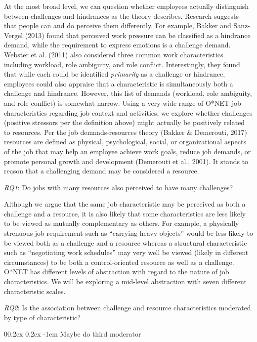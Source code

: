 \documentclass[
  man]{apa6}
\makeatletter
\let\oldparagraph\paragraph
\renewcommand{\paragraph}[1]{\oldparagraph{#1}\mbox{}}
\renewcommand{\paragraph}{\@startsection{paragraph}{4}{\parindent}%
  {0\baselineskip \@plus 0.2ex \@minus 0.2ex}%
  {-1em}%
  {\normalfont\normalsize\bfseries\itshape\typesectitle}}
\makeatother
\begin{document}
At the most broad level, we can question whether employees actually distinguish between challenges and hindrances as the theory describes. Research suggests that people can and do perceive them differently. For example, Bakker and Sanz-Vergel (2013) found that perceived work pressure can be classified as a hindrance demand, while the requirement to express emotions is a challenge demand. Webster et al. (2011) also considered three common work characteristics including workload, role ambiguity, and role conflict. Interestingly, they found that while each could be identified \emph{primarily} as a challenge or hindrance, employees could also appraise that a characteristic is simultaneously both a challenge and hindrance. However, this list of demands (workload, role ambiguity, and role conflict) is somewhat narrow. Using a very wide range of O*NET job characteristics regarding job context and activities, we explore whether challenges (positive stressors per the definition above) might actually be positively related to resources. Per the job demands-resources theory (Bakker \& Demerouti, 2017) resources are defined as physical, psychological, social, or organizational aspects of the job that may help an employee achieve work goals, reduce job demands, or promote personal growth and development (Demerouti et al., 2001). It stands to reason that a challenging demand may be considered a resource.

\emph{RQ1}: Do jobs with many resources also perceived to have many challenges?

Although we argue that the same job characteristic may be perceived as both a challenge and a resource, it is also likely that some characteristics are less likely to be viewed as mutually complementary as others. For example, a physically strenuous job requirement such as ``carrying heavy objects'' would be less likely to be viewed both as a challenge and a resource whereas a structural characteristic such as ``negotiating work schedules'' may very well be viewed (likely in different circumstances) to be both a control-oriented resource as well as a challenge. O*NET has different levels of abstraction with regard to the nature of job characteristics. We will be exploring a mid-level abstraction with seven different characteristic scales.

\emph{RQ2}: Is the association between challenge and resource characteristics moderated by type of characteristic?

\hypertarget{maybe-do-third-moderator}{%
\paragraph{Maybe do third moderator}\label{maybe-do-third-moderator}}
\end{document}
